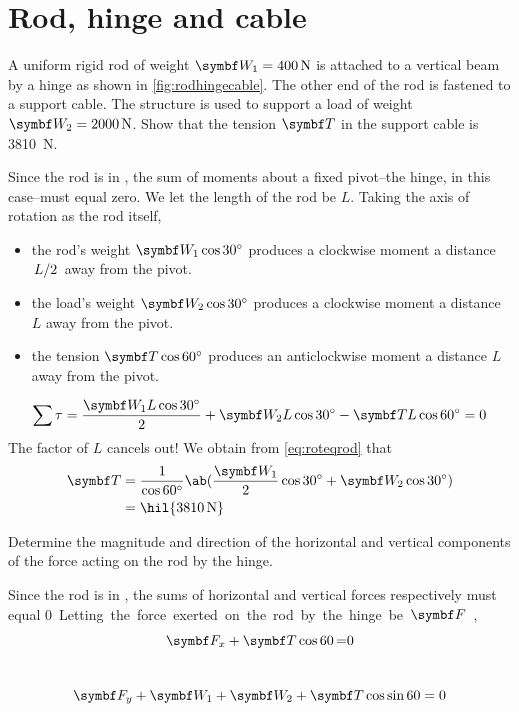 \section{Rod, hinge and cable}
\begin{problem}
  A uniform rigid rod of weight \(\mv{W}_1 = \qty{400}{\newton}\) is
  attached to a vertical beam by a hinge as shown in \cref{fig:rodhingecable}.
  The other end of the rod is fastened to a support cable. The structure is
  used to support a load of weight \(\mv{W}_2 = \qty{2000}{\newton}\).
  Show that the tension \(\mv{T}\) in the support cable is \qty{3810}{\newton}.
\end{problem}
Since the rod is in , the sum of moments about
a fixed pivot--the hinge, in this case--must equal zero. We let the
length of the rod be \(L\).
Taking the axis of rotation as the rod itself,
\begin{itemize}
  \item the rod's weight \(\mv{W_1}\cos\qty{30}{\degree}\) produces a
    clockwise moment a distance \(\lf{L}{2}\) away from the pivot.
  \item the load's weight \(\mv{W_2}\cos\qty{30}{\degree}\) produces
    a clockwise moment a distance \(L\) away from the pivot.
  \item the tension \(\mv{T}\cos\qty{60}{\degree}\) produces an
    anticlockwise moment a distance \(L\) away from the pivot.
\end{itemize}
\begin{equation}
  \sum\tau = \f{\mv{W}_1L\cos\qty{30}{\degree}}{2} +
  \mv{W}_2L\cos\qty{30}{\degree} - \mv{T}L\cos\qty{60}{\degree}=0
  \label{eq:roteqrod}
\end{equation}
The factor of \(L\) cancels out! We obtain from \cref{eq:roteqrod} that
\begin{align*}
  \mv{T} &=
  \f{1}{\cos\qty{60}{\degree}}\ab(\f{\mv{W}_1}{2}\cos\qty{30}{\degree}+\mv{W}_2\cos\qty{30}{\degree})
  \\
  &= \hil{\qty{3810}{\newton}}
\end{align*}

\begin{problem}
  Determine the magnitude and direction of the horizontal and
  vertical components
  of the force acting on the rod by the hinge.
\end{problem}
Since the rod is in , the sums of horizontal
and vertical forces respectively must equal \qty{0}. Letting the force exerted
on the rod by the hinge be \(\mv{F}\),
\begin{equation}
  \label{eq:sigmafxrod}
  \mv{F}_x + \mv{T}\cos\qty{60} = 0
\end{equation}
\begin{equation}
  \label{eq:sigmafyrod}
  \mv{F}_y + \mv{W}_1 + \mv{W}_2 + \mv{T}\cos\sin{60} = 0
\end{equation}

